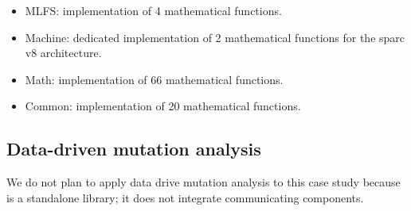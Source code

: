 \begin{itemize}
	\item MLFS: implementation of 4 mathematical functions.
	\item Machine: dedicated implementation of 2 mathematical functions for the sparc v8 architecture.
	\item Math: implementation of 66 mathematical functions.
	\item Common: implementation of 20 mathematical functions.
\end{itemize}

%
%
%
%


\subsection{Data-driven mutation analysis}

We do not plan to apply data drive mutation analysis to this case study because is a standalone library; it does not integrate communicating components.



